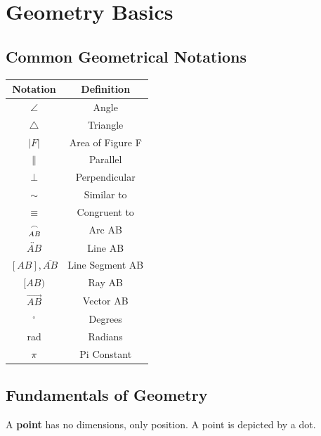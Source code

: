 \section{Geometry Basics}

    \subsection{Common Geometrical Notations}
        \begin{center}
            \begin{tabular}{|c|c|}
                \hline
                \textbf{Notation} & \textbf{Definition} \\
                \hline
                $\angle$ & Angle \\
                \hline
                $\triangle$ & Triangle \\
                \hline
                $|F|$ & Area of Figure F \\
                \hline
                $\parallel$ & Parallel \\
                \hline
                $\perp$ & Perpendicular \\
                \hline
                $\sim$ & Similar to \\
                \hline
                $\equiv$ & Congruent to \\
                \hline
                $\frown \atop AB$ & Arc AB \\
                \hline
                $\overleftrightarrow{AB}$ & Line AB \\
                \hline
                $[AB],\overline{AB}$ & Line Segment AB \\
                \hline
                $[AB)$ & Ray AB \\
                \hline
                $\overrightarrow{AB}$ & Vector AB \\
                \hline
                $^{\circ}$ & Degrees \\
                \hline
                rad & Radians \\
                \hline
                $\pi$ & Pi Constant \\
                \hline
            \end{tabular}
        \end{center}



    \subsection{Fundamentals of Geometry}
        A \textbf{point} has no dimensions, only position. A point is depicted by a dot. \\

